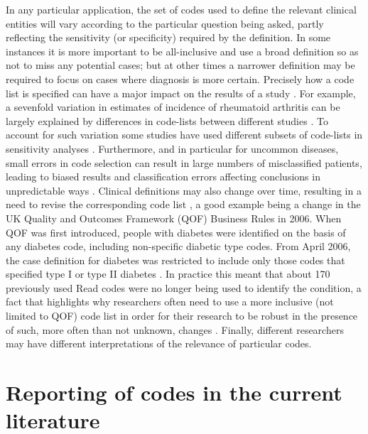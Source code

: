 \documentclass[10pt]{article}
\begin{document}
In any particular application, the set of codes used to define the relevant clinical entities will vary according to the particular question being asked, partly reflecting the sensitivity (or specificity) required by the definition. In some instances it is more important to be all-inclusive and use a broad definition so as not to miss any potential cases; but at other times a narrower definition may be required to focus on cases where diagnosis is more certain.  Precisely how a code list is specified can have a major impact on the results of a study \cite{Nicholson2011}. For example, a sevenfold variation in estimates of incidence of rheumatoid arthritis can be largely explained by differences in code-lists between different studies \cite{Garcia2009, Watson2003}.  To account for such variation some studies have used different subsets of code-lists in sensitivity analyses \cite{Doran2011, Herrett2010}.  Furthermore, and in particular for uncommon diseases, small errors in code selection can result in large numbers of misclassified patients, leading to biased results and classification errors affecting conclusions in unpredictable ways \cite{Manuel2010}. Clinical definitions may also change over time, resulting in a need to revise the corresponding code list \cite{Gulliford2009}, a good example being a change in the UK Quality and Outcomes Framework (QOF) Business Rules in 2006. When QOF was first introduced, people with diabetes were identified on the basis of any diabetes code, including non-specific diabetic type codes.  From April 2006, the case definition for diabetes was restricted to include only those codes that specified type I or type II diabetes \cite{Hippisley-Cox2006}.  In practice this meant that about 170 previously used Read codes were no longer being used to identify the condition, a fact that highlights why researchers often need to use a more inclusive (not limited to QOF) code list in order for their research to be robust in the presence of such, more often than not unknown, changes \cite{Kontopantelis2012}. Finally, different researchers may have different interpretations of the relevance of particular codes.

\section*{Reporting of codes in the current literature}
\end{document}
